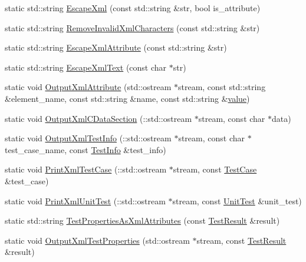 \begin{DoxyCompactItemize}
\item 
static std\+::string \mbox{\hyperlink{classtesting_1_1internal_1_1_xml_unit_test_result_printer_a7f3312312208d937ffd4a4ee461bfde9}{Escape\+Xml}} (const std\+::string \&str, bool is\+\_\+attribute)
\item 
static std\+::string \mbox{\hyperlink{classtesting_1_1internal_1_1_xml_unit_test_result_printer_abbdc9836847322cb699d817973e57bac}{Remove\+Invalid\+Xml\+Characters}} (const std\+::string \&str)
\item 
static std\+::string \mbox{\hyperlink{classtesting_1_1internal_1_1_xml_unit_test_result_printer_aad574d7bb0c24578d5acc57817b9d367}{Escape\+Xml\+Attribute}} (const std\+::string \&str)
\item 
static std\+::string \mbox{\hyperlink{classtesting_1_1internal_1_1_xml_unit_test_result_printer_a934486bda28e7013f2d07520d5098a31}{Escape\+Xml\+Text}} (const char $\ast$str)
\item 
static void \mbox{\hyperlink{classtesting_1_1internal_1_1_xml_unit_test_result_printer_a3ace4e5b1866dc7755079e609f046f83}{Output\+Xml\+Attribute}} (std\+::ostream $\ast$stream, const std\+::string \&element\+\_\+name, const std\+::string \&name, const std\+::string \&\mbox{\hyperlink{_obj__test_2lib_2googletest-master_2googlemock_2test_2gmock-matchers__test_8cc_a337b8a670efc0b086ad3af163f3121b6}{value}})
\item 
static void \mbox{\hyperlink{classtesting_1_1internal_1_1_xml_unit_test_result_printer_a0b6f9682a642f88bb779a4f744ad3d92}{Output\+Xml\+C\+Data\+Section}} (\+::std\+::ostream $\ast$stream, const char $\ast$data)
\item 
static void \mbox{\hyperlink{classtesting_1_1internal_1_1_xml_unit_test_result_printer_aae9565df9a02936738f830745a88b303}{Output\+Xml\+Test\+Info}} (\+::std\+::ostream $\ast$stream, const char $\ast$test\+\_\+case\+\_\+name, const \mbox{\hyperlink{classtesting_1_1_test_info}{Test\+Info}} \&test\+\_\+info)
\item 
static void \mbox{\hyperlink{classtesting_1_1internal_1_1_xml_unit_test_result_printer_a7f7accabeac896d4271f36d24ca02dba}{Print\+Xml\+Test\+Case}} (\+::std\+::ostream $\ast$stream, const \mbox{\hyperlink{classtesting_1_1_test_case}{Test\+Case}} \&test\+\_\+case)
\item 
static void \mbox{\hyperlink{classtesting_1_1internal_1_1_xml_unit_test_result_printer_acd8c9f3bd2e7eb1aa4170d61559c1a1a}{Print\+Xml\+Unit\+Test}} (\+::std\+::ostream $\ast$stream, const \mbox{\hyperlink{classtesting_1_1_unit_test}{Unit\+Test}} \&unit\+\_\+test)
\item 
static std\+::string \mbox{\hyperlink{classtesting_1_1internal_1_1_xml_unit_test_result_printer_aa9c9455eb572848d68002e8b9920e32e}{Test\+Properties\+As\+Xml\+Attributes}} (const \mbox{\hyperlink{classtesting_1_1_test_result}{Test\+Result}} \&result)
\item 
static void \mbox{\hyperlink{classtesting_1_1internal_1_1_xml_unit_test_result_printer_a256e5f631f2a729b3992098ae59513e7}{Output\+Xml\+Test\+Properties}} (std\+::ostream $\ast$stream, const \mbox{\hyperlink{classtesting_1_1_test_result}{Test\+Result}} \&result)
\end{DoxyCompactItemize}
